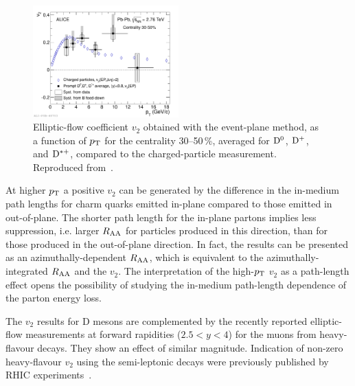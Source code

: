 \begin{figure}
\centering
\includegraphics[width=0.5\textwidth]{heavyflavorfigs/DmesonV2.pdf}
\caption{Elliptic-flow coefficient $v_2$ obtained with the event-plane method, as a function of $p_{\rm T}$ for the centrality 30--50\,\%, averaged for ${\rm D}^0$, ${\rm D}^+$, and ${\rm D}^{*+}$, compared to the charged-particle measurement. Reproduced from~\cite{Abelev:2013lca}.}
\label{figks:DmesonV2}
\end{figure}

At higher $p_{\rm T}$ a positive $v_2$ can be generated by the difference in the in-medium path lengths for charm quarks emitted in-plane compared to those emitted in out-of-plane. The shorter path length for the in-plane partons implies less suppression, i.e. larger $R_{\rm AA}$ for particles produced in this direction, than for those produced in the out-of-plane direction. In fact, the results can be presented as an azimuthally-dependent $R_{\rm AA}$, which is equivalent to the azimuthally-integrated $R_{\rm AA}$ and the $v_2$. The interpretation of the high-$p_{\rm T}$ $v_2$ as a path-length effect opens the possibility of studying  the in-medium path-length dependence of the parton energy loss.

The $v_2$ results for D mesons are complemented by the recently reported elliptic-flow measurements at forward rapidities ($2.5 < y < 4$) for the muons from heavy-flavour decays. They show an effect of similar magnitude. Indication of non-zero heavy-flavour $v_2$ using the semi-leptonic decays were previously published by RHIC experiments~\cite{Adler:2005ab,Adare:2006nq}. 